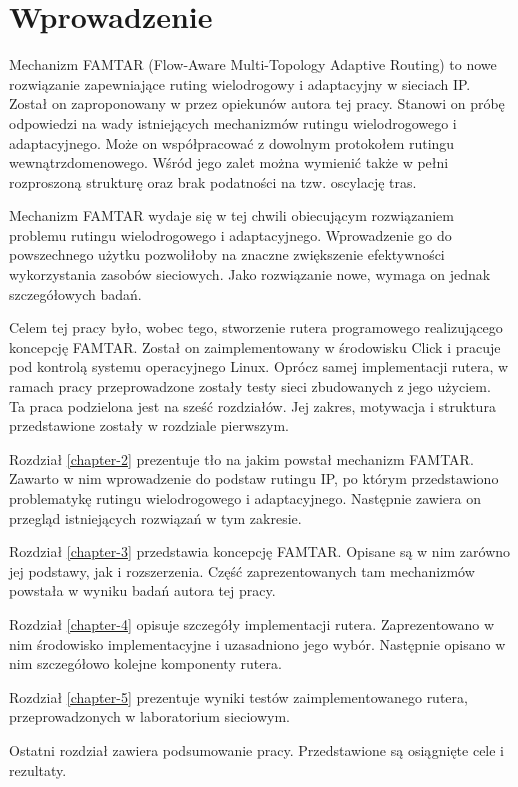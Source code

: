 \chapter{Wprowadzenie}

Mechanizm FAMTAR (Flow-Aware Multi-Topology Adaptive Routing) to nowe rozwiązanie zapewniające ruting wielodrogowy i adaptacyjny w sieciach IP. Został on zaproponowany w \cite{FAMTAR_LETTERS} przez opiekunów autora tej pracy. Stanowi on próbę odpowiedzi na wady istniejących mechanizmów rutingu wielodrogowego i adaptacyjnego. Może on współpracować z dowolnym protokołem rutingu wewnątrzdomenowego. Wśród jego zalet można wymienić także w pełni rozproszoną strukturę oraz brak podatności na tzw. oscylację tras.

Mechanizm FAMTAR wydaje się w tej chwili obiecującym rozwiązaniem problemu rutingu wielodrogowego i adaptacyjnego. Wprowadzenie go do powszechnego użytku pozwoliłoby na znaczne zwiększenie efektywności wykorzystania zasobów sieciowych. Jako rozwiązanie nowe, wymaga on jednak szczegółowych badań.

Celem tej pracy było, wobec tego, stworzenie rutera programowego realizującego koncepcję FAMTAR. Został on zaimplementowany w środowisku Click i pracuje pod kontrolą systemu operacyjnego Linux. Oprócz samej implementacji rutera, w ramach pracy przeprowadzone zostały testy sieci zbudowanych z jego użyciem. \\

\noindent Ta praca podzielona jest na sześć rozdziałów. Jej zakres, motywacja i struktura przedstawione zostały w rozdziale pierwszym.

Rozdział \ref{chapter-2} prezentuje tło na jakim powstał mechanizm FAMTAR. Zawarto w nim wprowadzenie do podstaw rutingu IP, po którym przedstawiono problematykę rutingu wielodrogowego i adaptacyjnego. Następnie zawiera on przegląd istniejących rozwiązań w tym zakresie.

Rozdział \ref{chapter-3} przedstawia koncepcję FAMTAR. Opisane są w nim zarówno jej podstawy, jak i rozszerzenia. Część zaprezentowanych tam mechanizmów powstała w wyniku badań autora tej pracy.

Rozdział \ref{chapter-4} opisuje szczegóły implementacji rutera. Zaprezentowano w nim środowisko implementacyjne i uzasadniono jego wybór. Następnie opisano w nim szczegółowo kolejne komponenty rutera.

Rozdział \ref{chapter-5} prezentuje wyniki testów zaimplementowanego rutera, przeprowadzonych w laboratorium sieciowym.

Ostatni rozdział zawiera podsumowanie pracy. Przedstawione są osiągnięte cele i rezultaty.
